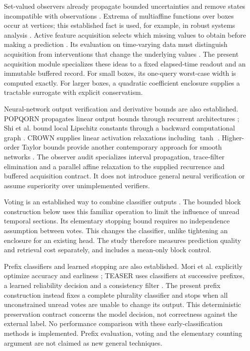 \documentclass[11pt,a4paper]{article}
\theoremstyle{definition}\newtheorem{definition}[theorem]{Definition}
\begin{document}
Set-valued observers already propagate bounded uncertainties and remove states incompatible with observations \cite{khajenejad2020}. Extrema of multiaffine functions over boxes occur at vertices; this established fact is used, for example, in robust systems analysis \cite{blanchini2022}. Active feature acquisition selects which missing values to obtain before making a prediction \cite{shim2018}. Its evaluation on time-varying data must distinguish acquisition from interventions that change the underlying values \cite{vonkleist2025}. The present acquisition module specializes these ideas to a fixed elapsed-time readout and an immutable buffered record. For small boxes, its one-query worst-case width is computed exactly. For larger boxes, a quadratic coefficient enclosure supplies a tractable surrogate with explicit conservatism.

Neural-network output verification and derivative bounds are also established. POPQORN propagates linear output bounds through recurrent architectures \cite{ko2019}; Shi et al. bound local Lipschitz constants through a backward computational graph \cite{shi2022}. CROWN supplies linear activation relaxations including $\tanh$ \cite{zhang2018crown}. Higher-order Taylor bounds provide another contemporary approach for smooth networks \cite{entesari2026}. The observer audit specializes interval propagation, trace-filter elimination and a parallel affine relaxation to the supplied recurrence and buffered acquisition contract. It does not introduce general neural verification or assume superiority over unimplemented verifiers.

Voting is an established way to combine classifier outputs \cite{dietterich2000}. The bounded block construction below uses this familiar operation to limit the influence of unread temporal sections. Its elementary stopping bound requires no independence assumption between votes. This changes the classifier, unlike tightening an enclosure for an existing head. The study therefore measures prediction quality and retrieval cost separately, and includes a mean-only block control.

Prefix classifiers and learned stopping are also established. Mori et al. explicitly optimize accuracy and earliness \cite{mori2018}; TEASER uses classifiers at successive prefixes, a learned reliability decision and a consistency filter \cite{schaefer2020}. The present prefix construction instead fixes a complete plurality classifier and stops when all unconstrained unread votes are unable to change its output. This deterministic preservation contract concerns the model decision, not correctness against the external label. No performance comparison with these early-classification methods is implemented. Prefix evaluation, voting and the elementary counting argument are not claimed as new general techniques.
\end{document}
